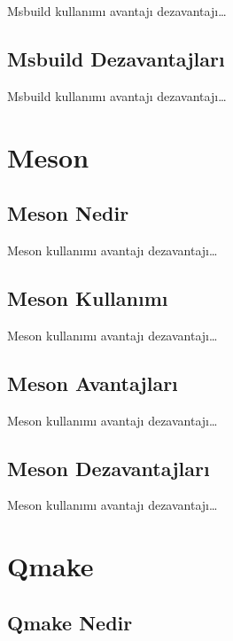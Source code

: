 \documentclass[
]{book}
\begin{document}
Msbuild kullanımı avantajı dezavantajı\ldots{}

\hypertarget{msbuild-dezavantajlarux131}{%
\section{Msbuild Dezavantajları}\label{msbuild-dezavantajlarux131}}

Msbuild kullanımı avantajı dezavantajı\ldots{}

\hypertarget{meson}{%
\chapter{Meson}\label{meson}}

\hypertarget{meson-nedir}{%
\section{Meson Nedir}\label{meson-nedir}}

Meson kullanımı avantajı dezavantajı\ldots{}

\hypertarget{meson-kullanux131mux131}{%
\section{Meson Kullanımı}\label{meson-kullanux131mux131}}

Meson kullanımı avantajı dezavantajı\ldots{}

\hypertarget{meson-avantajlarux131}{%
\section{Meson Avantajları}\label{meson-avantajlarux131}}

Meson kullanımı avantajı dezavantajı\ldots{}

\hypertarget{meson-dezavantajlarux131}{%
\section{Meson Dezavantajları}\label{meson-dezavantajlarux131}}

Meson kullanımı avantajı dezavantajı\ldots{}

\hypertarget{qmake}{%
\chapter{Qmake}\label{qmake}}

\hypertarget{qmake-nedir}{%
\section{Qmake Nedir}\label{qmake-nedir}}
\end{document}
